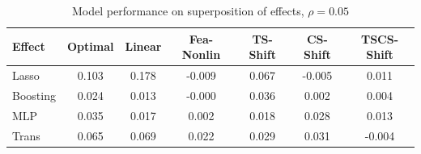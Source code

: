 \documentclass{article}
\begin{document}
\begin{table}[t]
    \centering
    \begin{tabular}{lcccccc}
\toprule
Effect & Optimal & Linear & Fea-Nonlin & TS-Shift & CS-Shift & TSCS-Shift \\
\midrule
Lasso & {\cellcolor[HTML]{B40426}} \color[HTML]{F1F1F1} 0.103 & {\cellcolor[HTML]{B40426}} \color[HTML]{F1F1F1} 0.178 & {\cellcolor[HTML]{3B4CC0}} \color[HTML]{F1F1F1} -0.009 & {\cellcolor[HTML]{B40426}} \color[HTML]{F1F1F1} 0.067 & {\cellcolor[HTML]{3B4CC0}} \color[HTML]{F1F1F1} -0.005 & {\cellcolor[HTML]{DC5D4A}} \color[HTML]{F1F1F1} 0.011 \\
Boosting & {\cellcolor[HTML]{3B4CC0}} \color[HTML]{F1F1F1} 0.024 & {\cellcolor[HTML]{3B4CC0}} \color[HTML]{F1F1F1} 0.013 & {\cellcolor[HTML]{9BBCFF}} \color[HTML]{000000} -0.000 & {\cellcolor[HTML]{B6CEFA}} \color[HTML]{000000} 0.036 & {\cellcolor[HTML]{799CF8}} \color[HTML]{F1F1F1} 0.002 & {\cellcolor[HTML]{D5DBE5}} \color[HTML]{000000} 0.004 \\
MLP & {\cellcolor[HTML]{6687ED}} \color[HTML]{F1F1F1} 0.035 & {\cellcolor[HTML]{4257C9}} \color[HTML]{F1F1F1} 0.017 & {\cellcolor[HTML]{B1CBFC}} \color[HTML]{000000} 0.002 & {\cellcolor[HTML]{3B4CC0}} \color[HTML]{F1F1F1} 0.018 & {\cellcolor[HTML]{D1493F}} \color[HTML]{F1F1F1} 0.028 & {\cellcolor[HTML]{B40426}} \color[HTML]{F1F1F1} 0.013 \\
Trans & {\cellcolor[HTML]{E1DAD6}} \color[HTML]{000000} 0.065 & {\cellcolor[HTML]{ABC8FD}} \color[HTML]{000000} 0.069 & {\cellcolor[HTML]{B40426}} \color[HTML]{F1F1F1} 0.022 & {\cellcolor[HTML]{84A7FC}} \color[HTML]{F1F1F1} 0.029 & {\cellcolor[HTML]{B40426}} \color[HTML]{F1F1F1} 0.031 & {\cellcolor[HTML]{3B4CC0}} \color[HTML]{F1F1F1} -0.004 \\
\bottomrule
\end{tabular}
\vskip 0.05in
\caption{Model performance on superposition of effects, $\rho = 0.05$}
    \label{tab:model_performance1}
    \end{table}
    
\end{document}
